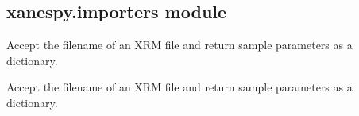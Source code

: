 \documentclass[letterpaper,10pt,english]{sphinxmanual}
\begin{document}
\subsection{xanespy.importers module}
\label{\detokenize{xanespy:module-xanespy.importers}}\label{\detokenize{xanespy:xanespy-importers-module}}

\begin{fulllineitems}
\label{\detokenize{xanespy:xanespy.importers.decode_aps_params}}
Accept the filename of an XRM file and return sample parameters as
a dictionary.

\end{fulllineitems}


\begin{fulllineitems}
\label{\detokenize{xanespy:xanespy.importers.decode_ssrl_params}}
Accept the filename of an XRM file and return sample parameters as
a dictionary.

\end{fulllineitems}


\begin{fulllineitems}
\label{\detokenize{xanespy:xanespy.importers.import_aps_8BM_xanes_dir}}
\end{fulllineitems}

\end{document}
